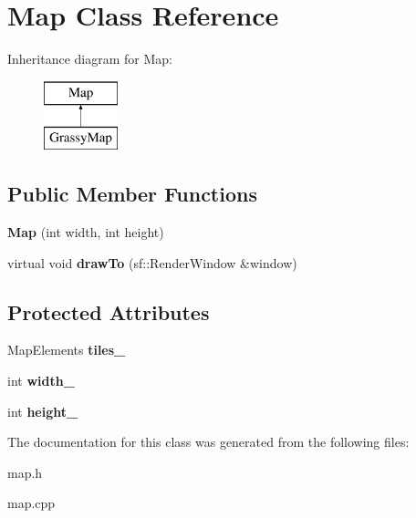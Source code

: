 \hypertarget{classMap}{}\section{Map Class Reference}
\label{classMap}
Inheritance diagram for Map\+:\begin{figure}[H]
\begin{center}
\leavevmode
\includegraphics[height=2.000000cm]{classMap}
\end{center}
\end{figure}
\subsection*{Public Member Functions}
\begin{DoxyCompactItemize}
\item 
\mbox{\label{classMap_a8497952fd6e1f0584d868e6ceb97d42d}} 
{\bfseries Map} (int width, int height)
\item 
\mbox{\label{classMap_acbc620429ff8e8de0a62ad322581535f}} 
virtual void {\bfseries draw\+To} (sf\+::\+Render\+Window \&window)
\end{DoxyCompactItemize}
\subsection*{Protected Attributes}
\begin{DoxyCompactItemize}
\item 
\mbox{\label{classMap_ab134971f0ca070bcf982391c5de2d913}} 
Map\+Elements {\bfseries tiles\+\_\+}
\item 
\mbox{\label{classMap_a6c90432856cd75ce1e19c4138caf82e7}} 
int {\bfseries width\+\_\+}
\item 
\mbox{\label{classMap_ad8bd63d7d81e3513726c55a1682afc52}} 
int {\bfseries height\+\_\+}
\end{DoxyCompactItemize}


The documentation for this class was generated from the following files\+:\begin{DoxyCompactItemize}
\item 
map.\+h\item 
map.\+cpp\end{DoxyCompactItemize}
